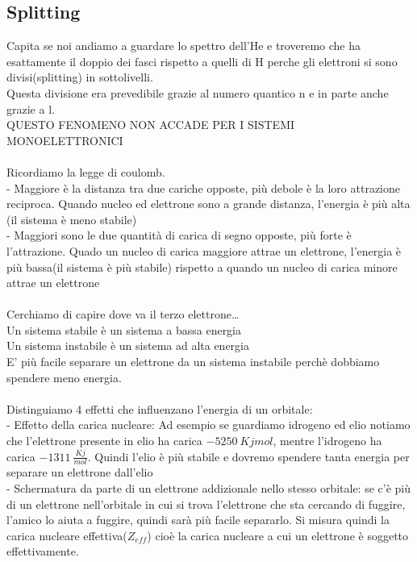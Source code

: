 \subsection{Splitting}
Capita se noi andiamo a guardare lo spettro dell’He e troveremo che ha esattamente il doppio dei fasci rispetto a quelli di H perche gli elettroni si sono divisi(splitting) in sottolivelli.\\
Questa divisione era prevedibile grazie al numero quantico n e in parte anche grazie a l.\\
QUESTO FENOMENO NON ACCADE PER I SISTEMI MONOELETTRONICI\\\\
Ricordiamo la legge di coulomb.\\
\tab- Maggiore è la distanza tra due cariche opposte, più debole è la loro attrazione reciproca. Quando nucleo ed elettrone sono a grande distanza, l’energia è più alta (il sistema è meno stabile)\\
\tab- Maggiori sono le due quantità di carica di segno opposte, più forte è l’attrazione. Quado un nucleo di carica maggiore attrae un elettrone, l’energia è più bassa(il sistema è più stabile) rispetto a quando un nucleo di carica minore attrae un elettrone\\\\
Cerchiamo di capire dove va il terzo elettrone…\\
Un sistema stabile è un sistema a bassa energia\\
Un sistema instabile è un sistema ad alta energia\\
E’ più facile separare un elettrone da un sistema instabile perchè dobbiamo spendere meno energia. \\\\
Distinguiamo 4 effetti che influenzano l’energia di un orbitale:\\
\tab- Effetto della carica nucleare: Ad esempio se guardiamo idrogeno ed elio notiamo che l’elettrone presente in elio  ha carica $-5250\ {Kj}{mol}$, mentre l’idrogeno ha carica $-1311\ \frac{Kj}{mol}$. Quindi l’elio è più stabile e dovremo spendere tanta energia per separare un elettrone dall’elio\\
\tab- Schermatura da parte di un elettrone addizionale nello stesso orbitale: se c’è più di un elettrone nell’orbitale in cui si trova l’elettrone che sta cercando di fuggire, l’amico lo aiuta a fuggire, quindi sarà più facile separarlo. Si misura quindi la carica nucleare effettiva($Z_{eff}$) cioè la carica nucleare a cui un elettrone è soggetto effettivamente.\\
